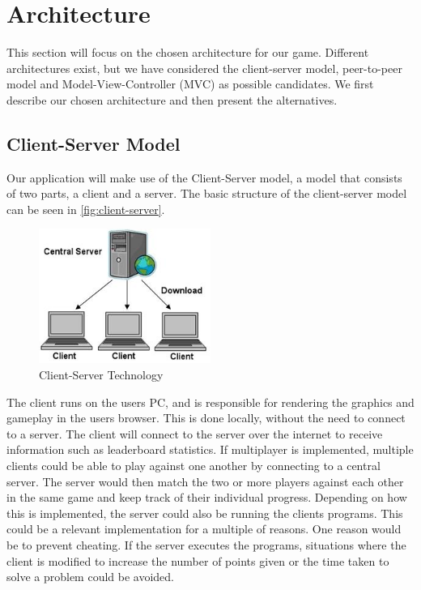 \section{Architecture}
\label{sec:architecture}

This section will focus on the chosen architecture for our game.
Different architectures exist, but we have considered the client-server model, peer-to-peer model and Model-View-Controller (MVC) as possible candidates.
We first describe our chosen architecture and then present the alternatives.

\subsection{Client-Server Model}
Our application will make use of the Client-Server model, a model that consists of two parts, a client and a server.
The basic structure of the client-server model can be seen in \autoref{fig:client-server}.

\begin{figure}[ht]
  \centering
    \includegraphics[width=0.5\textwidth]{img/client_server.jpg}
  \caption{Client-Server Technology \citep{ClientServer}}
  \label{fig:client-server}
\end{figure}

The client runs on the users PC, and is responsible for rendering the graphics and gameplay in the users browser.
This is done locally, without the need to connect to a server.
The client will connect to the server over the internet to receive information such as leaderboard statistics.
If multiplayer is implemented, multiple clients could be able to play against one another by connecting to a central server.
The server would then match the two or more players against each other in the same game and keep track of their individual progress.
Depending on how this is implemented, the server could also be running the clients programs.
This could be a relevant implementation for a multiple of reasons.
One reason would be to prevent cheating.
If the server executes the programs, situations where the client is modified to increase the number of points given or the time taken to solve a problem could be avoided.

